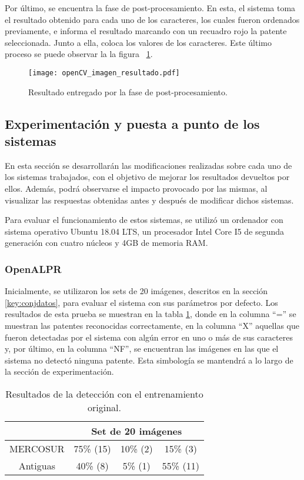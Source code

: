 Por último, se encuentra la fase de post-procesamiento. En esta, el sistema toma el resultado obtenido para cada uno de los caracteres, los cuales fueron ordenados previamente, e informa el resultado marcando con un recuadro rojo la patente seleccionada. Junto a ella, coloca los valores de los caracteres. Este último proceso se puede observar la la figura  ~\ref{fig:img_result_opencv}.

\begin{figure}[H]
	\centering
	\texttt{[image: openCV\_imagen\_resultado.pdf]}
	\caption{Resultado entregado por la fase de post-procesamiento.}
	\label{fig:img_result_opencv}
\end{figure}	
		
		
\subsection{Experimentación y puesta a punto de los sistemas} \label{key:experimentaconypuesta}
	
En esta sección se desarrollarán las modificaciones realizadas sobre cada uno de los sistemas trabajados, con el objetivo de mejorar los resultados devueltos por ellos. Además, podrá observarse el impacto provocado por las mismas, al visualizar las respuestas obtenidas antes y después de modificar dichos sistemas. 

Para evaluar el funcionamiento de estos sistemas, se utilizó un ordenador con sistema operativo Ubuntu 18.04 LTS, un procesador Intel Core I5 de segunda generación con cuatro núcleos y 4GB de memoria RAM. 

		
\subsubsection{OpenALPR}		
		
Inicialmente, se utilizaron los sets de 20 imágenes, descritos en la sección \ref{key:conjdatos}, para evaluar el sistema con sus parámetros por defecto. Los resultados de esta prueba se muestran en la tabla \ref{tabla:openalpr_Torig}, donde en la columna ``='' se muestran las patentes reconocidas correctamente, en la columna ``X'' aquellas que fueron detectadas por el sistema con algún error en uno o más de sus caracteres y, por último, en la columna ``NF'', se encuentran las imágenes en las que el sistema no detectó ninguna patente. Esta simbología se mantendrá a lo largo de la sección de experimentación.
		
\begin{table}[htbp]
	\begin{center}
		\begin{tabular}{|c|c|c|c|}
			\hline
			& \multicolumn{3}{c|}{Set de 20 imágenes}\\
			\hline
			MERCOSUR & 75\% (15) & 10\% (2) & 15\% (3)\\
			\hline 
			Antiguas & 40\% (8) & 5\% (1) & 55\% (11)\\ \hline
		\end{tabular}
		\caption{Resultados de la detección con el entrenamiento original.}
		\label{tabla:openalpr_Torig}
	\end{center}
\end{table}		
		

